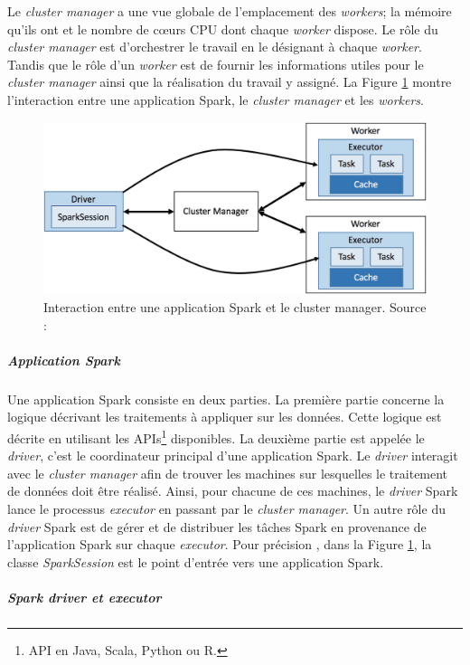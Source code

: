 Le \textit{cluster manager} a une vue globale de l'emplacement des \textit{workers}; la mémoire qu'ils ont et le nombre de c\oe{}urs CPU dont chaque \textit{worker} dispose. Le rôle du \textit{cluster manager} est d'orchestrer le travail en le désignant à chaque \textit{worker}. Tandis que le rôle d'un \textit{worker} est de fournir les informations utiles pour le \textit{cluster manager} ainsi que la réalisation du travail y assigné. La Figure \ref{fig:cluster-overview} montre l'interaction entre une application Spark, le \textit{cluster manager} et les \textit{workers}.


\begin{figure}[h]
	\centering
	\captionsetup{justification= centering}
	\includegraphics[width=0.7\linewidth]{illustrations/cluster-overview.jpg}
	\caption{ Interaction entre une application Spark et le cluster manager. Source : \cite{eginning-Apache-Spark-2-cluster-overwiew}}
	\label{fig:cluster-overview}
\end{figure}




\subparagraph{Application Spark} \label{sparkpresentationsection}
Une application Spark consiste en deux parties. La première partie concerne la logique décrivant les traitements à appliquer sur les données.  Cette logique est décrite en utilisant les APIs\footnote{API en Java, Scala, Python ou R.} disponibles. La deuxième partie est appelée le \textit{driver}, c'est le coordinateur principal d'une application Spark. Le \textit{driver} interagit avec le \textit{cluster manager} afin de trouver les machines sur lesquelles le traitement de données doit être réalisé. Ainsi, pour chacune de ces machines, le \textit{driver} Spark lance le processus \textit{executor} en passant par le \textit{cluster manager}. Un autre rôle du  \textit{driver} Spark est de gérer et de distribuer les tâches Spark en provenance de l'application Spark sur chaque \textit{executor}. Pour précision , dans la Figure \ref{fig:cluster-overview}, la classe \textit{SparkSession} est le point d'entrée vers une application Spark.

\subparagraph{Spark driver et executor}


